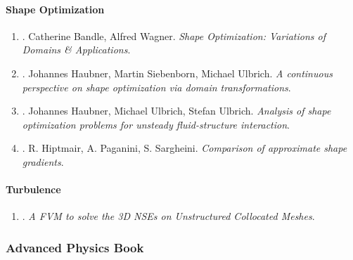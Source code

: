 \documentclass{article}
\begin{document}
\paragraph{Shape Optimization}

\begin{enumerate}
	\item \cite{Bandle_Wagner2023}. Catherine Bandle, Alfred Wagner. {\it Shape Optimization: Variations of Domains \& Applications}.\hfill{\sf[reading]}
	
	\item \cite{Haubner_Siebenborn_Ulbrich2021}. Johannes Haubner, Martin Siebenborn, Michael Ulbrich. {\it A continuous perspective on shape optimization via domain transformations}.\hfill{\sf[done]}
	
	\item \cite{Haubner_Ulbrich_Ulbrich2020}. Johannes Haubner, Michael Ulbrich, Stefan Ulbrich. {\it Analysis of shape optimization problems for unsteady fluid-structure interaction}.\hfill{\sf[done]}
	
	\item \cite{Hiptmair_Paganini_Sargheini2015}. R. Hiptmair, A. Paganini, S. Sargheini. {\it Comparison of approximate shape gradients}.\hfill{\sf[done]}
\end{enumerate}

\paragraph{Turbulence}

\begin{enumerate}
	\item \cite{Perron_Boivin_Herard2004}. {\it A FVM to solve the 3{D} NSEs on Unstructured Collocated Meshes}.\hfill{\sf[reading]}
\end{enumerate}


\subsubsection{Advanced Physics Book}
\end{document}
